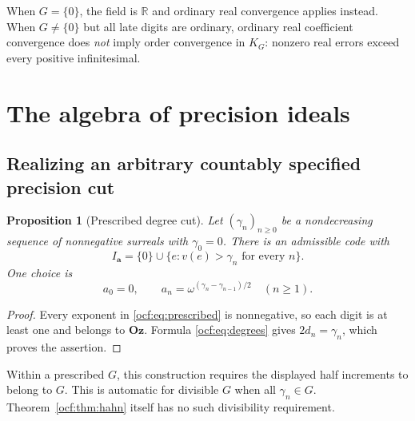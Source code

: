 \documentclass[11pt,a4paper]{article}
\numberwithin{equation}{section}
\newtheorem{proposition}[theorem]{Proposition}
\theoremstyle{definition}
\theoremstyle{remark}
\newcommand{\Oz}{\mathbf{Oz}}
\newcommand{\R}{\mathbb R}
\newcommand{\codea}{\boldsymbol a}
\begin{document}
When $G=\{0\}$, the field is $\R$ and ordinary real convergence applies
instead. When $G\ne\{0\}$ but all late digits are ordinary, ordinary
real coefficient convergence does \emph{not} imply order convergence in
$K_G$: nonzero real errors exceed every positive infinitesimal.

\section{The algebra of precision ideals}
\label{ocf:sec:ideals}

\subsection{Realizing an arbitrary countably specified precision cut}

\begin{proposition}[Prescribed degree cut]\label{ocf:prop:prescribed}
Let $(\gamma_n)_{n\ge0}$ be a nondecreasing sequence of nonnegative
surreals with $\gamma_0=0$. There is an admissible code with
\[
 I_{\codea}=\{0\}\cup\{e:v(e)>\gamma_n\text{ for every }n\}.
\]
One choice is
\begin{equation}\label{ocf:eq:prescribed}
 a_0=0,\qquad a_n=\omega^{(\gamma_n-\gamma_{n-1})/2}\quad(n\ge1).
\end{equation}
\end{proposition}
\begin{proof}
Every exponent in \eqref{ocf:eq:prescribed} is nonnegative, so each digit is at
least one and belongs to $\Oz$. Formula \eqref{ocf:eq:degrees} gives
$2d_n=\gamma_n$, which proves the assertion.
\end{proof}

Within a prescribed $G$, this construction requires the displayed half
increments to belong to $G$. This is automatic for divisible $G$ when all
$\gamma_n\in G$. Theorem~\ref{ocf:thm:hahn} itself has no such divisibility
requirement.
\end{document}
